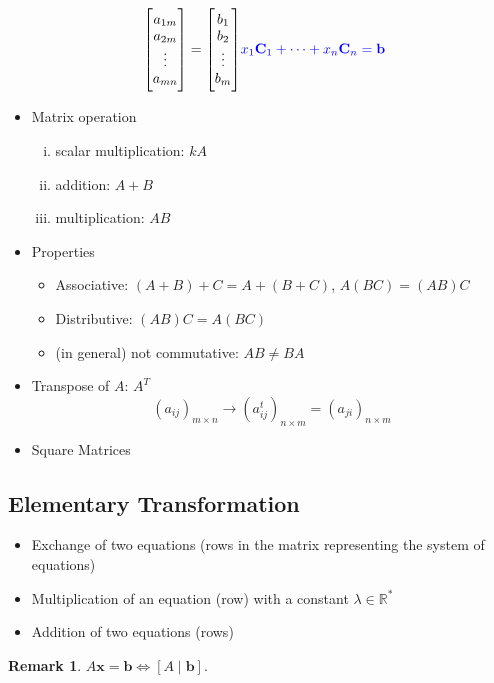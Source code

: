 \documentclass[12pt,openany]{book}
\theoremstyle{definition}
\newtheorem{remark}{Remark}[chapter]
\newcommand{\R}{\mathbb{R}}
\begin{document}
\begin{itemize}
\begin{align*}
\begin{bmatrix}
				a_{1m}\\ a_{2m}\\ \vdots\\ a_{mn}
			\end{bmatrix}=\begin{bmatrix}
				b_1\\ b_2\\ \vdots\\ b_{m} 
			\end{bmatrix} & \textcolor{blue}{x_1\textbf{C}_1+\cdots+x_n\textbf{C}_n=\textbf{b}}
		\end{align*}
		\item Matrix operation
		\begin{enumerate}[(i)]
			\item scalar multiplication: $kA$
			\item addition: $A+B$
			\item multiplication: $AB$
		\end{enumerate}
		\item Properties \begin{itemize}
			\item Associative: $(A+B)+C=A+(B+C)$, $A(BC)=(AB)C$
			\item Distributive: $(AB)C=A(BC)$
			\item (in general) not commutative: $AB\neq BA$
		\end{itemize}
		\item Transpose of $A$: $A^T$ \[
		(a_{ij})_{m\times n}\longrightarrow(a^t_{ij})_{n\times m}=(a_{ji})_{n\times m}
		\]
		\item Square Matrices
	\end{itemize}
	
	\subsection{Elementary Transformation}
	\begin{itemize}
		\item Exchange of two equations (rows in the matrix representing the system
		of equations)
		\item Multiplication of an equation (row) with a constant $\lambda\in\R^*$
		\item Addition of two equations (rows)
	\end{itemize}
	
	\begin{remark}
		$A\textbf{x}=\textbf{b}\iff[A\mid\textbf{b}]$.
	\end{remark}
	
\end{document}
